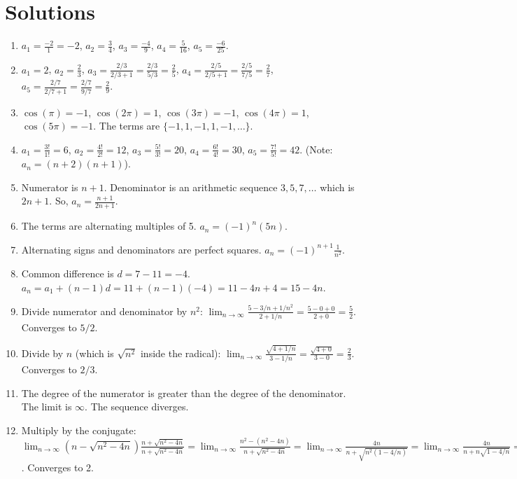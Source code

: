 \documentclass{article}
\begin{document}
\section*{Solutions}
\begin{enumerate}
    \item $a_1 = \frac{-2}{1} = -2$, $a_2 = \frac{3}{4}$, $a_3 = \frac{-4}{9}$, $a_4 = \frac{5}{16}$, $a_5 = \frac{-6}{25}$.
    \item $a_1 = 2$, $a_2 = \frac{2}{3}$, $a_3 = \frac{2/3}{2/3+1} = \frac{2/3}{5/3} = \frac{2}{5}$, $a_4 = \frac{2/5}{2/5+1} = \frac{2/5}{7/5} = \frac{2}{7}$, $a_5 = \frac{2/7}{2/7+1} = \frac{2/7}{9/7} = \frac{2}{9}$.
    \item $\cos(\pi)=-1$, $\cos(2\pi)=1$, $\cos(3\pi)=-1$, $\cos(4\pi)=1$, $\cos(5\pi)=-1$. The terms are $\{-1, 1, -1, 1, -1, \dots\}$.
    \item $a_1 = \frac{3!}{1!} = 6$, $a_2 = \frac{4!}{2!} = 12$, $a_3 = \frac{5!}{3!} = 20$, $a_4 = \frac{6!}{4!} = 30$, $a_5 = \frac{7!}{5!} = 42$. (Note: $a_n = (n+2)(n+1)$).
    \item Numerator is $n+1$. Denominator is an arithmetic sequence $3,5,7,\dots$ which is $2n+1$. So, $a_n = \frac{n+1}{2n+1}$.
    \item The terms are alternating multiples of 5. $a_n = (-1)^n (5n)$.
    \item Alternating signs and denominators are perfect squares. $a_n = (-1)^{n+1} \frac{1}{n^2}$.
    \item Common difference is $d = 7-11 = -4$. $a_n = a_1 + (n-1)d = 11 + (n-1)(-4) = 11 - 4n + 4 = 15 - 4n$.
    \item Divide numerator and denominator by $n^2$: $\lim_{n\to\infty} \frac{5 - 3/n + 1/n^2}{2 + 1/n} = \frac{5-0+0}{2+0} = \frac{5}{2}$. Converges to $5/2$.
    \item Divide by $n$ (which is $\sqrt{n^2}$ inside the radical): $\lim_{n\to\infty} \frac{\sqrt{4 + 1/n}}{3 - 1/n} = \frac{\sqrt{4+0}}{3-0} = \frac{2}{3}$. Converges to $2/3$.
    \item The degree of the numerator is greater than the degree of the denominator. The limit is $\infty$. The sequence diverges.
    \item Multiply by the conjugate: $\lim_{n\to\infty} (n - \sqrt{n^2-4n}) \frac{n + \sqrt{n^2-4n}}{n + \sqrt{n^2-4n}} = \lim_{n\to\infty} \frac{n^2 - (n^2-4n)}{n + \sqrt{n^2-4n}} = \lim_{n\to\infty} \frac{4n}{n + \sqrt{n^2(1-4/n)}} = \lim_{n\to\infty} \frac{4n}{n + n\sqrt{1-4/n}} = \lim_{n\to\infty} \frac{4}{1 + \sqrt{1-4/n}} = \frac{4}{1+\sqrt{1}} = 2$. Converges to 2.

\end{enumerate}
\end{document}

